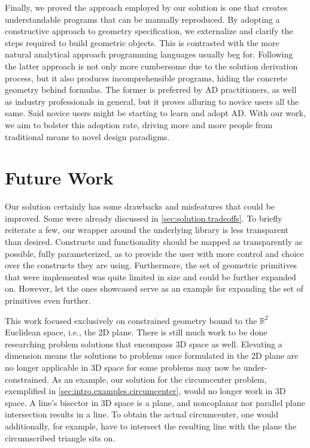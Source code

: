 Finally, we proved the approach employed by our solution is one that creates
understandable programs that can be manually reproduced.  By adopting a
constructive approach to geometry specification, we externalize and clarify the
steps required to build geometric objects.  This is contrasted with the more
natural analytical approach programming languages usually beg for.  Following
the latter approach is not only more cumbersome due to the solution derivation
process, but it also produces incomprehensible programs, hiding the concrete
geometry behind formulas.  The former is preferred by \ac{AD} practitioners, as
well as industry professionals in general, but it proves alluring to novice
users all the same.  Said novice users might be starting to learn and adopt
\ac{AD}.  With our work, we aim to bolster this adoption rate, driving more and
more people from traditional means to novel design paradigms.

\section*{Future Work}

Our solution certainly has some drawbacks and misfeatures that could be
improved.  Some were already discussed in \cref{sec:solution.tradeoffs}.  To
briefly reiterate a few, our wrapper around the underlying library is less
transparent than desired.  Constructs and functionality should be mapped as
transparently as possible, fully parameterized, as to provide the user with more
control and choice over the constructs they are using.  Furthermore, the set of
geometric primitives that were implemented was quite limited in size and could
be further expanded on.  However, let the ones showcased serve as an example for
expanding the set of primitives even further.

This work focused exclusively on constrained geometry bound to the
$\mathbb{R}^2$ Euclidean space, i.e., the 2D plane.  There is still much work to
be done researching problem solutions that encompass 3D space as well.
Elevating a dimension means the solutions to problems once formulated in the 2D
plane are no longer applicable in 3D space for some problems may now be
under-constrained.  As an example, our solution for the circumcenter problem,
exemplified in \cref{sec:intro.examples.circumcenter}, would no longer work in
3D space.  A line's bisector in 3D space is a plane, and noncoplanar nor
parallel plane intersection results in a line.  To obtain the actual
circumcenter, one would additionally, for example, have to intersect the
resulting line with the plane the circumscribed triangle sits on.
